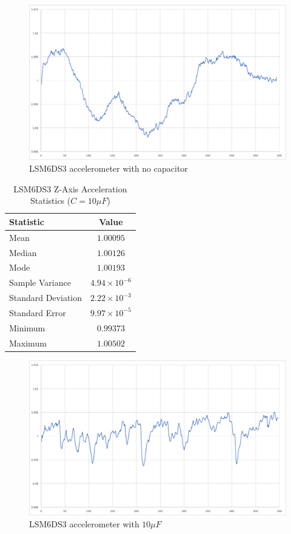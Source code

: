 \begin{figure}[ht]
  \centering
  \includegraphics[width=1.0\textwidth]{Controls/no_cap.png}
  \caption{\label{fig:no_cap} LSM6DS3 accelerometer with no capacitor}
\end{figure}

\begin{table}[H]
\caption{\label{tab:10uF} LSM6DS3 Z-Axis Acceleration Statistics ($C=10\mu F$)}
\centering
\begin{tabular}{l|c}
\hline\hline
\textbf{Statistic}      & \textbf{Value}            \\\hline
Mean                    & $1.00095$                 \\\hline
Median                  & $1.00126$                 \\\hline
Mode  	                & $1.00193$                 \\\hline
Sample Variance         & $4.94\times10^{\minus6}$  \\\hline
Standard Deviation      & $2.22\times10^{\minus3}$  \\\hline
Standard Error  	    & $9.97\times10^{\minus5}$  \\\hline
Minimum                 & $0.99373$                 \\\hline
Maximum                 & $1.00502$                 \\\hline
\end{tabular}
\end{table}

\begin{figure}[ht]
  \centering
  \includegraphics[width=1.0\textwidth]{Controls/10uF.png}
  \caption{\label{fig:10uF} LSM6DS3 accelerometer with $10\mu F$}
\end{figure}

